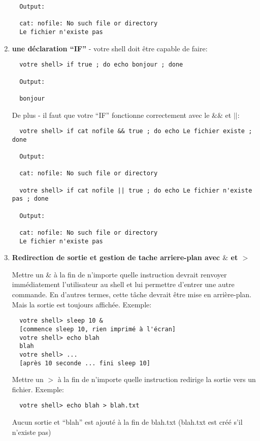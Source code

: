 \documentclass{article}
\begin{document}
\begin{enumerate}
\begin{verbatim}
  Output:

  cat: nofile: No such file or directory
  Le fichier n'existe pas

\end{verbatim}
\newpage

\item \textbf{une déclaration ``IF''} - votre shell doit être  capable de faire:

\begin{verbatim}
  votre shell> if true ; do echo bonjour ; done

  Output:

  bonjour
\end{verbatim}
  De plus - il faut que votre ``IF'' fonctionne correctement avec le  $\&\&$ et $||$:

  
\begin{verbatim}
  votre shell> if cat nofile && true ; do echo Le fichier existe ; done

  Output:
  
  cat: nofile: No such file or directory

  votre shell> if cat nofile || true ; do echo Le fichier n'existe pas ; done

  Output:

  cat: nofile: No such file or directory
  Le fichier n'existe pas

\end{verbatim}
  
\item \textbf{Redirection de sortie et gestion de tache arriere-plan avec $\&$ et $>$}

 Mettre un \& à la fin de n'importe quelle instruction devrait renvoyer immédiatement l'utilisateur au shell et lui permettre d'entrer une autre commande. En d'autres termes, cette tâche devrait être mise en arrière-plan. Mais la sortie est toujours affichée. Exemple:

\begin{verbatim}
  votre shell> sleep 10 &
  [commence sleep 10, rien imprimé à l'écran]
  votre shell> echo blah
  blah
  votre shell> ...
  [après 10 seconde ... fini sleep 10]
\end{verbatim}

Mettre un $>$  à la fin de n'importe quelle instruction redirige la sortie vers un fichier. Exemple:

\begin{verbatim}
  votre shell> echo blah > blah.txt
\end{verbatim}
Aucun sortie et ``blah'' est ajouté à la fin de blah.txt (blah.txt est créé s'il n'existe pas)


\end{enumerate}
\end{document}
